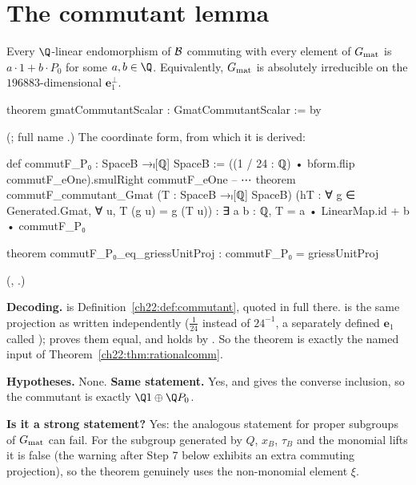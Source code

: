 \section{The commutant lemma}\label{ch22:sec:commutant}

\begin{theorem}\label{ch22:thm:commutant}
Every $\Q$-linear endomorphism of $\mathcal{B}$ commuting with every element of $G_{\mathrm{mat}}$ is $a\cdot1+b\cdot P_0$ for
some $a,b\in\Q$.  Equivalently, $G_{\mathrm{mat}}$ is absolutely irreducible on the $196883$-dimensional $\mathbf{e}_1^\perp$.
\end{theorem}
\begin{leancode}
theorem gmatCommutantScalar : GmatCommutantScalar := by
\end{leancode}
(; full name
.)  The coordinate form, from which it is derived:
\begin{leancode}
def commutF_P₀ : SpaceB →ₗ[ℚ] SpaceB :=
  ((1 / 24 : ℚ) • bform.flip commutF_eOne).smulRight commutF_eOne
-- ⋯
theorem commutF_commutant_Gmat (T : SpaceB →ₗ[ℚ] SpaceB)
    (hT : ∀ g ∈ Generated.Gmat, ∀ u, T (g u) = g (T u)) :
    ∃ a b : ℚ, T = a • LinearMap.id + b • commutF_P₀
\end{leancode}
\begin{leancode}
theorem commutF_P₀_eq_griessUnitProj : commutF_P₀ = griessUnitProj
\end{leancode}
(, .)
\begin{dictionary}
\textbf{Decoding.}   is Definition~\ref{ch22:def:commutant}, quoted in full there.
 is the same projection as  written independently ($\frac1{24}$ instead of
$24^{-1}$, a separately defined $\mathbf{e}_1$ called );  proves them equal, and
 holds by .  So the theorem is exactly the named input of
Theorem~\ref{ch22:thm:rationalcomm}.

\textbf{Hypotheses.}  None.  \textbf{Same statement.}  Yes, and  gives the converse
inclusion, so the commutant is exactly $\Q1\oplus\Q P_0$.

\textbf{Is it a strong statement?}  Yes: the analogous statement for proper subgroups of $G_{\mathrm{mat}}$ can fail.  For
the subgroup generated by $Q$, $x_B$, $\tau_B$ and the monomial lifts it is false (the warning after Step 7 below exhibits an
extra commuting projection), so the theorem genuinely uses the non-monomial element $\xi$.
\end{dictionary}


